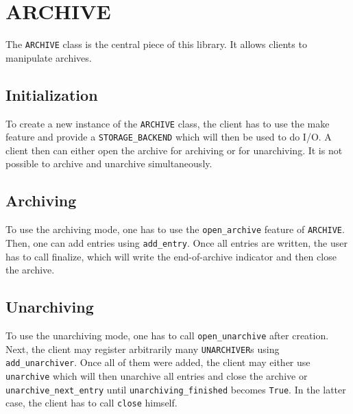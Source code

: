 \chapter{ARCHIVE}
The \lstinline;ARCHIVE; class is the central piece of this library. It allows
clients to manipulate archives.

\section{Initialization}
To create a new instance of the \lstinline;ARCHIVE; class, the client has to use
the make feature and provide a \lstinline;STORAGE_BACKEND; which will then be
used to do I/O. A client then can either open the archive for archiving or for
unarchiving. It is not possible to archive and unarchive simultaneously.

\section{Archiving}
To use the archiving mode, one has to use the \lstinline;open_archive; feature
of \lstinline;ARCHIVE;. Then, one can add entries using \lstinline;add_entry;.
Once all entries are written, the user has to call finalize, which will write
the end-of-archive indicator and then close the archive.

\section{Unarchiving}
To use the unarchiving mode, one has to call \lstinline;open_unarchive; after
creation. Next, the client may register arbitrarily many \lstinline;UNARCHIVER;s
using \lstinline;add_unarchiver;. Once all of them were added, the client may
either use \lstinline;unarchive; which will then unarchive all entries and close
the archive or \lstinline;unarchive_next_entry; until
\lstinline;unarchiving_finished; becomes \lstinline;True;. In the latter case,
the client has to call \lstinline;close; himself.

